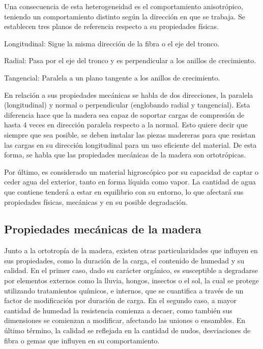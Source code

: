 Una consecuencia de esta heterogeneidad es el comportamiento anisotrópico, teniendo un comportamiento distinto según la dirección en que se trabaja. Se establecen tres planos de referencia respecto a su propiedades físicas.
\begin{itemize*}
	\item Longitudinal: Sigue la misma dirección de la fibra o el eje del tronco.
	\item Radial: Pasa por el eje del tronco y es perpendicular a los anillos de crecimiento.
	\item Tangencial: Paralela a un plano tangente a los anillos de crecimiento.
\end{itemize*}
En relación a sus propiedades mecánicas se habla de dos direcciones, la paralela (longitudinal) y normal o perpendicular (englobando radial y tangencial). Esta diferencia hace que la madera sea capaz de soportar cargas de compresión de hasta 4 veces en dirección paralela respecto a la normal. Esto quiere decir que siempre que sea posible, se deben instalar las piezas madereras para que resistan las cargas en su dirección longitudinal para un uso eficiente del material. De esta forma, se habla que las propiedades mecánicas de la madera son ortotrópicas.

Por último, es considerado un material higroscópico por su capacidad de captar o ceder agua del exterior, tanto en forma líquida como vapor. La cantidad de agua que contiene tenderá a estar en equilibrio con su entorno, lo que afectará sus propiedades físicas, mecánicas y en su posible degradación.

\subsection{Propiedades mecánicas de la madera}
Junto a la ortotropía de la madera, existen otras particularidades que influyen en sus propiedades, como la duración de la carga, el contenido de humedad y su calidad. En el primer caso, dado su carácter orgánico, es susceptible a degradarse por elementos externos como la lluvia, hongos, insectos o el sol, la cual se protege utilizando tratamientos químicos, e internos, que se cuantifica a través de un factor de modificación por duración de carga. En el segundo caso, a mayor cantidad de humedad la resistencia comienza a decaer, como también sus dimensiones se comienzan a modificar, afectando las uniones o ensambles. En último término, la calidad se reflejada en la cantidad de nudos, desviaciones de fibra o gemas que influyen en su comportamiento.

